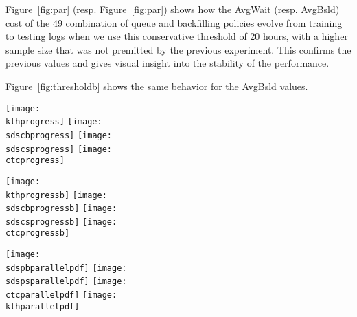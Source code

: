 Figure~\ref{fig:par} (resp. Figure~\ref{fig:par}) shows how the AvgWait (resp.
AvgBsld) cost of the 49 combination of queue and backfilling policies evolve
from training to testing logs when we use this conservative threshold of 20
hours, with a higher sample size that was not premitted by the previous
experiment. This confirms the previous values and gives visual insight into the
stability of the performance.

Figure~\ref{fig:thresholdb} shows the same behavior for the AvgBsld
values.

\begin{figure*}[ht!]
  \centering
  \texttt{[image: \\kthprogress]}
  \texttt{[image: \\sdscbprogress]}
  \texttt{[image: \\sdscsprogress]}
  \texttt{[image: \\ctcprogress]}

  \caption{AvgWait and MaxWait generalization of thresholded policies as
  affected by the queue threshold. The Value reported as "train" is that of the
least costly heuristic among the 49 possible policy parametrizations averaged
on the \textit{training} logs. The Value reported as "test" is the averaged
cost of the same heuristic on the \textit{testing} logs.}

  \label{fig:threshold}
\end{figure*}

\begin{figure*}[ht!]
  \centering
  \texttt{[image: \\kthprogressb]}
  \texttt{[image: \\sdscbprogressb]}
  \texttt{[image: \\sdscsprogressb]}
  \texttt{[image: \\ctcprogressb]}

  \caption{AvgBsld and MaxBsld generalization of thresholded policies as
  affected by the queue threshold. The Value reported as "train" is that of the
least costly heuristic among the 49 possible policy parametrizations averaged
on the \textit{training} logs. The Value reported as "test" is the averaged
cost of the same heuristic on the \textit{testing} logs.}

  \label{fig:thresholdb}
\end{figure*}

\begin{figure*}[ht!]
  \centering
  \texttt{[image: \\sdspbparallelpdf]}
  \texttt{[image: \\sdspsparallelpdf]}
  \texttt{[image: \\ctcparallelpdf]}
  \texttt{[image: \\kthparallelpdf]}

  \caption{AvgWait generalization of thresholded policies obtained by using a
  threshold value of 20 hours. Note that each plot has a different vertical y axis. The
reported AvgWait and MaxWait values are averaged over 300 resampled weeks from
the training or testing original logs, normalized over the cost of
EASY-FCFS-FCFS. The "Worst MaxWait" value is the highest (300 week averaged)
maximum average bounded slowdown increase percentage reported for any of the 49
heuristics. The values reported under Learned Performance are the (300 week
averaged) decrease percentages obtained by the best \textbf{Training}
heuristinc on the \textbf{Testing} logs.}

  \label{fig:par}
\end{figure*}

